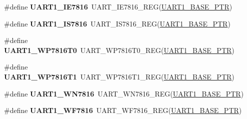 \begin{DoxyCompactItemize}
\item 
\hypertarget{group___u_a_r_t___register___accessor___macros_gad4fbe231b7995379d56ce15b24b9a75d}{}\#define {\bfseries U\+A\+R\+T1\+\_\+\+I\+E7816}~U\+A\+R\+T\+\_\+\+I\+E7816\+\_\+\+R\+E\+G(\hyperlink{group___u_a_r_t___peripheral_gafb5b1236c1cdf2d9a6464251b791030c}{U\+A\+R\+T1\+\_\+\+B\+A\+S\+E\+\_\+\+P\+T\+R})\label{group___u_a_r_t___register___accessor___macros_gad4fbe231b7995379d56ce15b24b9a75d}

\item 
\hypertarget{group___u_a_r_t___register___accessor___macros_gad969eab3763fb8dd1e703fd4d3cc3abb}{}\#define {\bfseries U\+A\+R\+T1\+\_\+\+I\+S7816}~U\+A\+R\+T\+\_\+\+I\+S7816\+\_\+\+R\+E\+G(\hyperlink{group___u_a_r_t___peripheral_gafb5b1236c1cdf2d9a6464251b791030c}{U\+A\+R\+T1\+\_\+\+B\+A\+S\+E\+\_\+\+P\+T\+R})\label{group___u_a_r_t___register___accessor___macros_gad969eab3763fb8dd1e703fd4d3cc3abb}

\item 
\hypertarget{group___u_a_r_t___register___accessor___macros_ga47fd492070482fb6e0a6c08d25bcb69b}{}\#define {\bfseries U\+A\+R\+T1\+\_\+\+W\+P7816\+T0}~U\+A\+R\+T\+\_\+\+W\+P7816\+T0\+\_\+\+R\+E\+G(\hyperlink{group___u_a_r_t___peripheral_gafb5b1236c1cdf2d9a6464251b791030c}{U\+A\+R\+T1\+\_\+\+B\+A\+S\+E\+\_\+\+P\+T\+R})\label{group___u_a_r_t___register___accessor___macros_ga47fd492070482fb6e0a6c08d25bcb69b}

\item 
\hypertarget{group___u_a_r_t___register___accessor___macros_ga3f9bd88d5b8ffe1e3dff9a1f2c6743d4}{}\#define {\bfseries U\+A\+R\+T1\+\_\+\+W\+P7816\+T1}~U\+A\+R\+T\+\_\+\+W\+P7816\+T1\+\_\+\+R\+E\+G(\hyperlink{group___u_a_r_t___peripheral_gafb5b1236c1cdf2d9a6464251b791030c}{U\+A\+R\+T1\+\_\+\+B\+A\+S\+E\+\_\+\+P\+T\+R})\label{group___u_a_r_t___register___accessor___macros_ga3f9bd88d5b8ffe1e3dff9a1f2c6743d4}

\item 
\hypertarget{group___u_a_r_t___register___accessor___macros_gae6e2fcd4834658d2df858dc96875ded7}{}\#define {\bfseries U\+A\+R\+T1\+\_\+\+W\+N7816}~U\+A\+R\+T\+\_\+\+W\+N7816\+\_\+\+R\+E\+G(\hyperlink{group___u_a_r_t___peripheral_gafb5b1236c1cdf2d9a6464251b791030c}{U\+A\+R\+T1\+\_\+\+B\+A\+S\+E\+\_\+\+P\+T\+R})\label{group___u_a_r_t___register___accessor___macros_gae6e2fcd4834658d2df858dc96875ded7}

\item 
\hypertarget{group___u_a_r_t___register___accessor___macros_ga99917b6f1285fd26a4c2a0afb7b3127e}{}\#define {\bfseries U\+A\+R\+T1\+\_\+\+W\+F7816}~U\+A\+R\+T\+\_\+\+W\+F7816\+\_\+\+R\+E\+G(\hyperlink{group___u_a_r_t___peripheral_gafb5b1236c1cdf2d9a6464251b791030c}{U\+A\+R\+T1\+\_\+\+B\+A\+S\+E\+\_\+\+P\+T\+R})\label{group___u_a_r_t___register___accessor___macros_ga99917b6f1285fd26a4c2a0afb7b3127e}


\end{DoxyCompactItemize}
